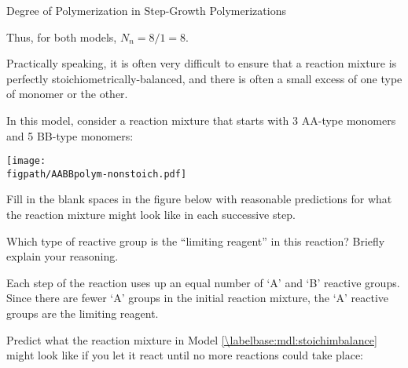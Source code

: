 \begin{activity}{Degree of Polymerization in Step-Growth Polymerizations}
\begin{ctqs}
\begin{solution}[1in]
			Thus, for both models, $N_n = 8/1 = 8$.
		\end{solution}
\end{ctqs}

\begin{model}
\label{\labelbase:mdl:stoichimbalance}

Practically speaking, it is often very difficult to ensure that a reaction mixture is perfectly stoichiometrically-balanced, and there is often a small excess of one type of monomer or the other.

In this model, consider a reaction mixture that starts with 3 AA-type monomers and 5 BB-type monomers:

\vspace{0.1in}
\centerline{\texttt{[image: \\figpath/AABBpolym-nonstoich.pdf]}}

\end{model}

\begin{ctqs}

		\question Fill in the blank spaces in the figure below with reasonable predictions for what the reaction mixture might look like in each successive step.
		
			\begin{solution}[1in]
			\end{solution}
		
		\clearpage
		\question Which type of reactive group is the ``limiting reagent'' in this reaction?  Briefly explain your reasoning.
		
			\begin{solution}[1in]
				Each step of the reaction uses up an equal number of `A' and `B' reactive groups. Since there are fewer `A' groups in the initial reaction mixture, the `A' reactive groups are the limiting reagent.
			\end{solution}
		
		\question \label{\labelbase:ctq:nonstoichpredict} Predict what the reaction mixture in Model \ref{\labelbase:mdl:stoichimbalance} might look like if you let it react until no more reactions could take place:
		
\begin{solution}
\end{solution}
		

\end{ctqs}
\end{activity}
